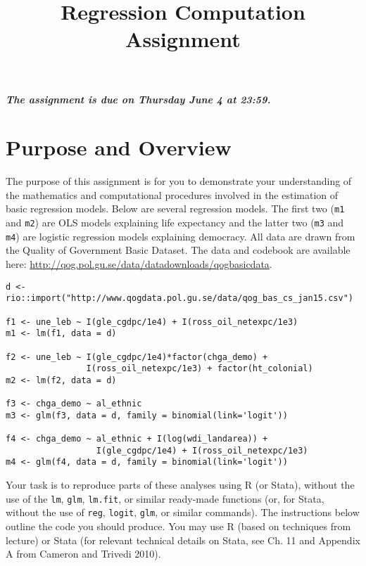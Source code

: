 \documentclass[a4paper,12pt]{article}
\title{Regression Computation Assignment}
\author{}
\date{}
\begin{document}
\vspace{-5em}

\maketitle

\vspace{-3em}

{\begin{center}\textit{\textbf{The assignment is due on Thursday June 4 at 23:59.}}\end{center}}

{\onehalfspacing

\section*{Purpose and Overview}

The purpose of this assignment is for you to demonstrate your understanding of the mathematics and computational procedures involved in the estimation of basic regression models. Below are several regression models. The first two (\texttt{m1} and \texttt{m2}) are OLS models explaining life expectancy and the latter two (\texttt{m3} and \texttt{m4}) are logistic regression models explaining democracy. All data are drawn from the Quality of Government Basic Dataset. The data and codebook are available here: \url{http://qog.pol.gu.se/data/datadownloads/qogbasicdata}.

\begin{lstlisting}
d <- rio::import("http://www.qogdata.pol.gu.se/data/qog_bas_cs_jan15.csv")

f1 <- une_leb ~ I(gle_cgdpc/1e4) + I(ross_oil_netexpc/1e3)
m1 <- lm(f1, data = d)

f2 <- une_leb ~ I(gle_cgdpc/1e4)*factor(chga_demo) + 
                I(ross_oil_netexpc/1e3) + factor(ht_colonial)
m2 <- lm(f2, data = d)

f3 <- chga_demo ~ al_ethnic
m3 <- glm(f3, data = d, family = binomial(link='logit'))

f4 <- chga_demo ~ al_ethnic + I(log(wdi_landarea)) + 
                  I(gle_cgdpc/1e4) + I(ross_oil_netexpc/1e3)
m4 <- glm(f4, data = d, family = binomial(link='logit'))
\end{lstlisting}

\vspace{1em}
\noindent Your task is to reproduce parts of these analyses using R (or Stata), without the use of the \texttt{lm}, \texttt{glm}, \texttt{lm.fit}, or similar ready-made functions (or, for Stata, without the use of \texttt{reg}, \texttt{logit}, \texttt{glm}, or similar commands). The instructions below outline the code you should produce. You may use R (based on techniques from lecture) or Stata (for relevant technical details on Stata, see Ch. 11 and Appendix A from Cameron and Trivedi 2010).
}
\end{document}
